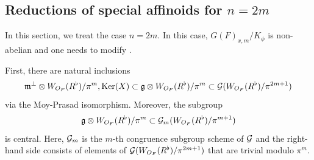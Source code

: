 \documentclass[12pt,reqno]{amsart}
\begin{document}
\subsection{Reductions of special affinoids for $n = 2m$} \label{ssec:reduction_even}

In this section, we treat the case $n = 2m$. In this case, $G(F)_{x, m} / K_\phi$ is non-abelian and one needs to modify . 

First, there are natural inclusions
\[
    {\mathfrak{m}}^\perp \otimes W_{O_F}(R^\flat) / \pi^m, {\operatorname{Ker}}(X) \subset {\mathfrak{g}} \otimes W_{O_F}(R^\flat) / \pi^m \subset {\mathcal{G}}(W_{O_F}(R^\flat) / \pi^{2m+1})
\]
via the Moy-Prasad isomorphism. Moreover, the subgroup
\[
    {\mathfrak{g}} \otimes W_{O_F}(R^\flat) / \pi^m \subset {\mathcal{G}}_m(W_{O_F}(R^\flat) / \pi^{m + 1})
\]
is central. Here, ${\mathcal{G}}_m$ is the $m$-th congruence subgroup scheme of ${\mathcal{G}}$ and the right-hand side consists of elements of ${\mathcal{G}}(W_{O_F}(R^\flat) / \pi^{2m+1})$ that are trivial modulo $\pi^m$. 
\end{document}

